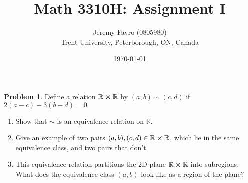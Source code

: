 \documentclass[10pt]{article}
\title{Math 3310H: Assignment I}
\author{Jeremy Favro (0805980) \\ Trent University, Peterborough, ON, Canada}
\date{\today}
\theoremstyle{definition}
\newtheorem{problem}{Problem}
\begin{document}
\maketitle

\begin{problem}
Define a relation $\mathbb{R}\cross\mathbb{R}$ by $(a,b)\sim(c,d)$ if $2(a-c)-3(b-d)=0$
\begin{enumerate}[label=(\alph*)]
  \item Show that $\sim$ is an equivalence relation on $\mathbb{R}$.
  \item Give an example of two pairs $(a,b),(c,d)\in\mathbb{R}\cross\mathbb{R}$, which lie in the same
        equivalence class, and two pairs that don't.
  \item This equivalence relation partitions the 2D plane $\mathbb{R}\cross\mathbb{R}$ into subregions.
        What does the equivalence class $(a,b)$ look like as a region of the plane?
\end{enumerate}
\end{problem}
\end{document}

